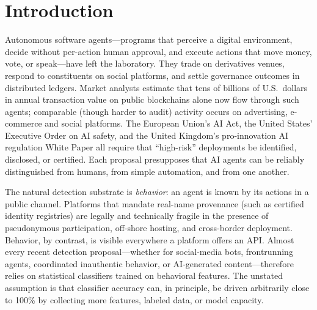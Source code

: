 \documentclass[11pt,a4paper]{article}
\begin{document}
\section*{Introduction}

Autonomous software agents---programs that perceive a digital environment,
decide without per-action human approval, and execute actions that move
money, vote, or speak---have left the laboratory. They trade on derivatives
venues, respond to constituents on social platforms, and settle governance
outcomes in distributed ledgers. Market analysts estimate that tens of
billions of U.S.\ dollars in annual transaction value on public blockchains
alone now flow through such agents\cite{daian2020flashboys,qin2022quantifying};
comparable (though harder to audit) activity occurs on advertising,
e-commerce and social platforms. The European Union's AI
Act\cite{eu_ai_act_2024}, the United States' Executive Order on AI
safety\cite{us_eo_14110}, and the United Kingdom's pro-innovation AI
regulation White Paper\cite{uk_ai_regulation_2023} all require that
``high-risk'' deployments be identified, disclosed, or certified. Each
proposal presupposes that AI agents can be reliably distinguished from
humans, from simple automation, and from one another.

The natural detection substrate is \emph{behavior}: an agent is known by its
actions in a public channel. Platforms that mandate real-name provenance
(such as certified identity registries) are legally and technically fragile
in the presence of pseudonymous participation, off-shore hosting, and
cross-border deployment. Behavior, by contrast, is visible everywhere a
platform offers an API. Almost every recent detection proposal---whether for
social-media bots\cite{varol2017,cresci2020detecting},
frontrunning agents\cite{daian2020flashboys,torres2021frontrunner}, coordinated
inauthentic behavior\cite{francois2020actors}, or
AI-generated content\cite{mitchell2023detectgpt,sadasivan2023}---therefore
relies on statistical classifiers trained on behavioral features. The
unstated assumption is that classifier accuracy can, in principle, be driven
arbitrarily close to 100\% by collecting more features, labeled data, or
model capacity.
\end{document}
